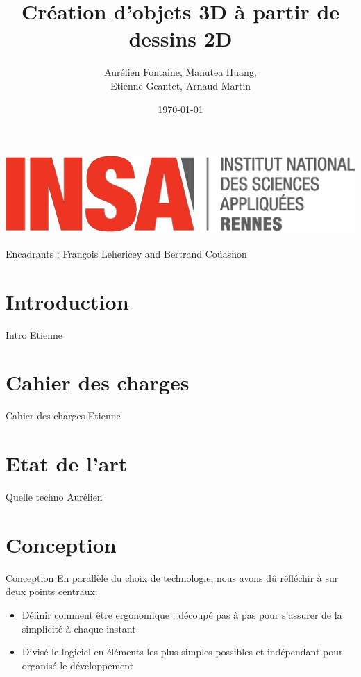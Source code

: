 \documentclass[a4paper,10pt]{beamer}
\title{Création d'objets 3D à partir de dessins 2D}
\author[Groupe 3INFO]{Aurélien Fontaine, Manutea Huang,
\\ Etienne Geantet, Arnaud Martin}
\institute[INSA de Rennes]{Institut National des Sciences Appliquées de Rennes}
\date{\today}
\begin{document}
	
	\begin{frame}
		\begin{titlepage}
			\centerline{\includegraphics[scale=0.1]{images/logos/logoINSA.jpg}}
			\centerline{Encadrants : François Lehericey and Bertrand Coüasnon}	
		\end{titlepage}
	\end{frame}
	
	\section{Introduction}
	
	\begin{frame}
		Intro Etienne 
	\end{frame}
	
	\begin{frame}
		\tableofcontents
	\end{frame}
	
	\section{Cahier des charges}
	
	\begin{frame}
		Cahier des charges Etienne 
	\end{frame}
	
	\section{Etat de l'art}
	
	\begin{frame}
		Quelle techno Aurélien
	\end{frame}
		

	
	\section{Conception}	
		\begin{frame}{Conception}
	 		En parallèle du choix de technologie, nous avons dû réfléchir à sur deux points centraux:
		
			\begin{itemize}
				  \item Définir comment être ergonomique : découpé pas à pas pour s'assurer de la simplicité à chaque instant
				  \item Divisé le logiciel en éléments les plus simples possibles et indépendant pour organisé le développement
			\end{itemize}
		\end{frame}
		
\end{document}
